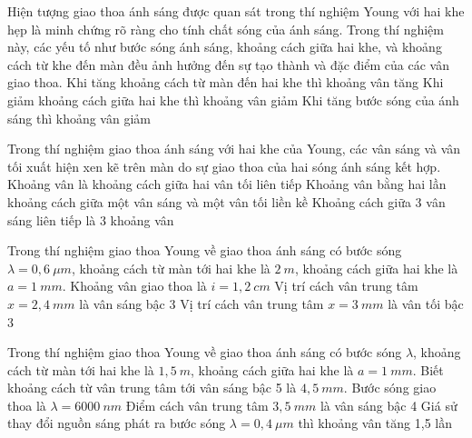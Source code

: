 \setcounter{paragraph}{0}
\setcounter{ex}{0}
\PhanII
\begin{ex}
Hiện tượng giao thoa ánh sáng được quan sát trong thí nghiệm Young với hai khe hẹp là minh chứng rõ ràng cho tính chất sóng của ánh sáng. Trong thí nghiệm này, các yếu tố như bước sóng ánh sáng, khoảng cách giữa hai khe, và khoảng cách từ khe đến màn đều ảnh hưởng đến sự tạo thành và đặc điểm của các vân giao thoa. 
{\True Khi tăng khoảng cách từ màn đến hai khe thì khoảng vân tăng}
{Khi giảm khoảng cách giữa hai khe thì khoảng vân giảm}
{Khi tăng bước sóng của ánh sáng thì khoảng vân giảm}
\loigiai{
\begin{itemchoice}
\itemch
\itemch
\itemch
\itemch
\end{itemchoice}
}
\end{ex} 
\begin{ex}
Trong thí nghiệm giao thoa ánh sáng với hai khe của Young, các vân sáng và vân tối xuất hiện xen kẽ trên màn do sự giao thoa của hai sóng ánh sáng kết hợp.
{\True Khoảng vân là khoảng cách giữa hai vân tối liên tiếp}
{\True Khoảng vân bằng hai lần khoảng cách giữa một vân sáng và một vân tối liền kề}
{Khoảng cách giữa 3 vân sáng liên tiếp là 3 khoảng vân}
\loigiai{
\begin{itemchoice}
\itemch
\itemch
\itemch
\itemch
\end{itemchoice}
}
\end{ex} 
\begin{ex}
Trong thí nghiệm giao thoa Young về giao thoa ánh sáng có bước sóng $\lambda=0,6\ \mu m$, khoảng cách từ màn tới hai khe là $2 \ m$, khoảng cách giữa hai khe là $a=1 \ mm$.
{Khoảng vân giao thoa là $i=1,2\ cm$}
{Vị trí cách vân trung tâm $x=2,4\ mm$ là vân sáng bậc 3}
{\True Vị trí cách vân trung tâm $x=3\ mm$ là vân tối bậc 3}
\loigiai{
\begin{itemchoice}
\itemch
\itemch
\itemch
\itemch
\end{itemchoice}
}
\end{ex} 
\begin{ex}
Trong thí nghiệm giao thoa Young về giao thoa ánh sáng có bước sóng $\lambda$, khoảng cách từ màn tới hai khe là $1,5 \ m$, khoảng cách giữa hai khe là $a=1 \ mm$. Biết khoảng cách từ vân trung tâm tới vân sáng bậc 5 là $4,5 \ mm$.
{Bước sóng giao thoa là $\lambda=6000\ nm$}
{Điểm cách vân trung tâm $3,5 \ mm$ là vân sáng bậc 4}
{Giá sử thay đổi nguồn sáng phát ra bước sóng $\lambda=0,4\ \mu m$ thì khoảng vân tăng 1,5 lần}
\loigiai{
\begin{itemchoice}
\itemch
\itemch
\itemch
\itemch
\end{itemchoice}
}
\end{ex} 

